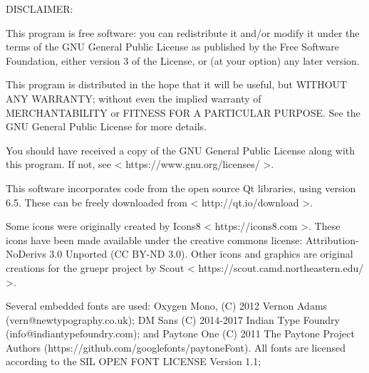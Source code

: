  DISCLAIMER\+: \begin{DoxyVerb} This program is free software: you can redistribute it and/or modify it under the terms of the GNU
 General Public License as published by the Free Software Foundation, either version 3 of the License,
 or (at your option) any later version.

 This program is distributed in the hope that it will be useful, but WITHOUT ANY WARRANTY; without even
 the implied warranty of MERCHANTABILITY or FITNESS FOR A PARTICULAR PURPOSE.  See the GNU General
 Public License for more details.

 You should have received a copy of the GNU General Public License along with this program.  If not, see
 < https://www.gnu.org/licenses/ >.

 This software incorporates code from the open source Qt libraries, using version 6.5. These can be
 freely downloaded from < http://qt.io/download >.

 Some icons were originally created by Icons8 < https://icons8.com >. These icons have been made
 available under the creative commons license: Attribution-NoDerivs 3.0 Unported (CC BY-ND 3.0). Other
 icons and graphics are original creations for the gruepr project by
 Scout < https://scout.camd.northeastern.edu/ >.

 Several embedded fonts are used:
 Oxygen Mono, (C) 2012 Vernon Adams (vern@newtypography.co.uk);
 DM Sans (C) 2014-2017 Indian Type Foundry (info@indiantypefoundry.com); and
 Paytone One (C) 2011 The Paytone Project Authors (https://github.com/googlefonts/paytoneFont).
 All fonts are licensed according to the SIL OPEN FONT LICENSE Version 1.1; 
\end{DoxyVerb}
 